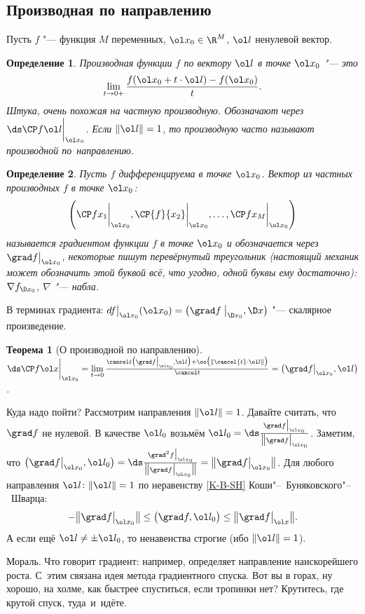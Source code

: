 \documentclass[a4paper,10pt,twoside]{article}
\newtheorem{Def}{Определение}[section]
\newtheorem{The}{Теорема}[section]
\begin{document}
	 \subsection{Производная по направлению}
	 Пусть $f$ "--- функция $M$ переменных, $\ol x_0\in\R^M$, $\ol l$ ненулевой вектор.
	 \begin{Def}
	 Производная функции $f$ по вектору $\ol l$ в точке $\ol x_0$ "--- это \[\lim\limits_{t\to 0+}\frac{f(\ol x_0 + t\cdot \ol l) - f(\ol x_0)}{t}.\]
	 Штука, очень похожая на частную производную. Обозначают через $\ds\CP f{\ol l}\bigg|_{\ol x_0}$. Если $\|\ol l\| = 1$, то производную часто называют производной
	 по~направлению.
	 \end{Def}
	 \begin{Def} Пусть $f$ дифференцируема в точке $\ol x_0$. Вектор из частных производных $f$ в точке $\ol x_0$:
	 \[\left(\CP f{x_1}\bigg|_{\ol x_0},\CP{f}{x_2}\bigg|_{\ol x_0},\ldots,\CP f{x_M}\bigg|_{\ol x_0}\right)\]
	 называется градиентом функции $f$ в точке $\ol x_0$ и  обозначается через $\grad f\big|_{\ol x_0}$,
	 некоторые пишут перевёрнутый треугольник (настоящий механик может обозначить этой буквой всё, что угодно, одной буквы ему достаточно):
	 $\nabla f_{\D x_0}$, $\nabla$ "--- набла.
	 \end{Def}
	 В терминах градиента: $df\big|_{\ol x_0}(\ol x_0)=\bigl(\grad f\bigm|_{\D x_0},\D x\bigr)$ "--- скалярное произведение.
	 \begin{The}[О производной по направлению]
	 $\ds\CP f{\ol x}\bigg|_{\ol x_0} = \lim\limits_{t\to 0}\frac{\cancel t\big(\grad f\bigm|_{\ol x_0},\ol l\big) + \oo\big(\|\cancel{t}\cdot \ol l\|\big)}{\cancel t} = \big(\grad f\big|_{\ol x_0},\ol l\big)$.
	 \end{The}
	 Куда надо пойти? Рассмотрим направления $\|\ol l\| = 1$. Давайте считать, что $\grad f$ не нулевой.
	 В качестве $\ol l_0$ возьмём $\ol l_0 = \ds\frac{\grad f\big|_{\ol x_0}}{\big\|\grad f\big|_{\ol x_0}}$.
	 Заметим, что $\big(\grad f\big|_{\ol x_0},\ol l_0\big) = \ds\frac{\grad^2 f\big|_{\ol x_0}}{\big\|\grad f\big|_{\ol x_0}\big\|} = \big\|\grad f\big|_{\ol x_0}\big\|$.
	 Для любого направления $\ol l\colon \|\ol l\| = 1$ по неравенству \ref{K-B-SH} Коши"--~Буняковского"--~Шварца:
	 \[-\big\|\grad f\big|_{\ol x_0}\big\|\le\big(\grad f,\ol l_0\big)\le \big\|\grad f\big|_{\ol x}\big\|.\]
	 А если ещё $\ol l\neq \pm\ol l_0$, то ненавенства строгие (ибо $\|\ol l\|=1$).
	 
	 Мораль. Что говорит градиент: например, определяет направление наискорейшего роста. С~этим связана идея
	 метода градиентного спуска. Вот вы в горах, ну хорошо, на холме, как быстрее спуститься, если тропинки нет? Крутитесь, где крутой спуск, туда~и~идёте.
	 
\end{document}
